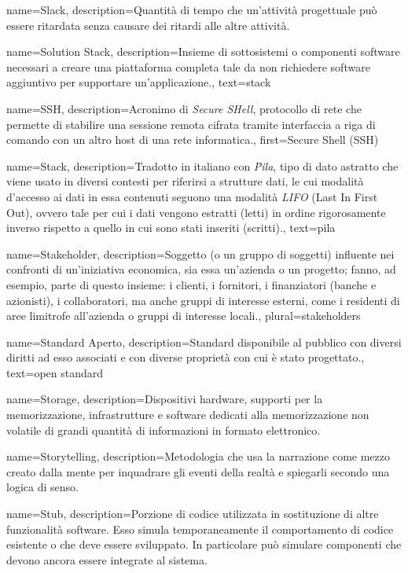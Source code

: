 {
name={Slack},
description={Quantità di tempo che un’attività progettuale può essere ritardata senza causare
dei ritardi alle altre attività.}
}

{
name={Solution Stack},
description={Insieme di sottosistemi o componenti software necessari a creare una piattaforma completa tale da non richiedere software aggiuntivo per supportare un'applicazione.},
text={stack}
}

{
name={SSH},
description={Acronimo di \textit{Secure SHell}, protocollo di rete che permette di stabilire una sessione remota cifrata tramite interfaccia a riga di comando con un altro host di una rete informatica.},
first={Secure Shell (SSH)}
}

{
name={Stack},
description={Tradotto in italiano con \textit{Pila}, tipo di dato astratto che viene usato in diversi contesti per riferirsi a strutture dati, le cui modalità d'accesso ai dati in essa contenuti seguono una modalità \textit{LIFO} (Last In First Out), ovvero tale per cui i dati vengono estratti (letti) in ordine rigorosamente inverso rispetto a quello in cui sono stati inseriti (scritti).},
text={pila}
}

{
name={Stakeholder},
description={Soggetto (o un gruppo di soggetti) influente nei confronti di un'iniziativa economica, sia essa un'azienda o un progetto; fanno, ad esempio, parte di questo insieme: i clienti, i fornitori, i finanziatori (banche e azionisti), i collaboratori, ma anche gruppi di interesse esterni, come i residenti di aree limitrofe all'azienda o gruppi di interesse locali.},
plural={stakeholders}
}

{
name={Standard Aperto},
description={Standard disponibile al pubblico con diversi diritti ad esso associati e con diverse proprietà con cui è stato progettato.},
text={open standard}
}

{
name={Storage},
description={Dispositivi hardware, supporti per la memorizzazione, infrastrutture e software dedicati alla memorizzazione non volatile di grandi quantità di informazioni in formato elettronico.}
}

{
name={Storytelling},
description={Metodologia che usa la narrazione come mezzo creato dalla mente per inquadrare gli eventi della realtà e spiegarli secondo una logica di senso.}
}

{
name={Stub},
description={Porzione di codice utilizzata in sostituzione di altre funzionalità software. Esso simula temporaneamente il comportamento di codice esistente o che deve essere sviluppato. In particolare può simulare componenti che devono ancora essere integrate al sistema.}
}

